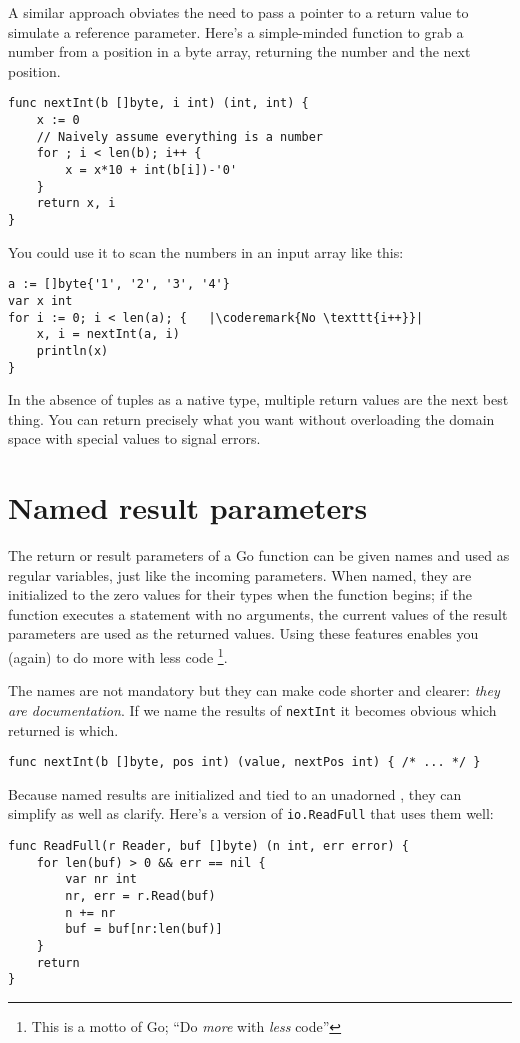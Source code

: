 A similar approach obviates the need to pass a pointer to a return value to
simulate a reference parameter. Here's a simple-minded function to grab a
number from a position in a byte array, returning the number and the next
position.
\begin{lstlisting}
func nextInt(b []byte, i int) (int, int) {
    x := 0
    // Naively assume everything is a number
    for ; i < len(b); i++ {
        x = x*10 + int(b[i])-'0'
    }
    return x, i
}
\end{lstlisting}
You could use it to scan the numbers in an input array  like this:
\begin{lstlisting}
a := []byte{'1', '2', '3', '4'}
var x int
for i := 0; i < len(a); {	|\coderemark{No \texttt{i++}}|
    x, i = nextInt(a, i)
    println(x)
}
\end{lstlisting}
In the absence of tuples as a native type, multiple return values are the next
best thing. You can return precisely what you want without
overloading the domain space with special values to signal errors.

\section{Named result parameters}
\label{sec:named result parameters}
The return or result parameters of a Go function can be given names and used
as regular variables, just like the incoming parameters. When named, they are
initialized to the zero values for their types when the function begins; if the
function executes a  statement with no arguments, the current values of
the result parameters are used as the returned values. Using these
features enables you (again) to do more with less code \footnote{This is
a motto of Go; ``Do \emph{more} with \emph{less} code''}.

The names are not mandatory but they can make code shorter and clearer:
\emph{they are documentation}. 
If we name the results of \lstinline{nextInt} it becomes obvious which
returned  is which.

\begin{lstlisting}
func nextInt(b []byte, pos int) (value, nextPos int) { /* ... */ }
\end{lstlisting}
Because named results are initialized and tied to an unadorned
,
they can simplify as well as clarify. Here's a version of
\lstinline{io.ReadFull} that uses them well:

\begin{lstlisting}
func ReadFull(r Reader, buf []byte) (n int, err error) {
    for len(buf) > 0 && err == nil {
        var nr int
        nr, err = r.Read(buf)
        n += nr
        buf = buf[nr:len(buf)]
    }
    return
}
\end{lstlisting}

